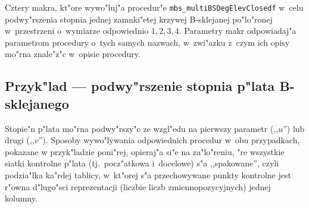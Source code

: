 \vspace{\bigskipamount}
Cztery makra, kt"ore wywo"luj"a procedur"e \texttt{mbs\_multiBSDegElevClosedf}
w~celu podwy"rszenia stopnia jednej zamnki"etej krzywej B-sklejanej po"lo"ronej
w~przestrzeni o~wymiarze odpowiednio $1,2,3,4$. Parametry makr odpowiadaj"a
pa\-ra\-met\-rom procedury o~tych samych nazwach, w~zwi"azku z~czym ich opisy
mo"rna znale"z"c w~opisie procedury.


\subsection*{Przyk"lad --- podwy"rszenie stopnia p"lata B-sklejanego}

Stopie"n p"lata mo"rna podwy"rszy"c ze wzgl"edu na pierwszy parametr
(,,$u$'') lub drugi (,,$v$''). Sposoby wywo"lywania odpowiednich procedur
w~obu przypadkach, pokazane w przyk"ladzie poni"rej, opieraj"a si"e na
za"lo"reniu, "re wszystkie siatki kontrolne p"lata (tj.\ pocz"atkowa
i~docelowe) s"a ,,spakowane'', czyli podzia"lka ka"rdej tablicy,
w~kt"orej s"a przechowywane punkty kontrolne jest r"owna d"lugo"sci
reprezentacji (liczbie liczb zmiennopozycyjnych) jednej kolumny.

